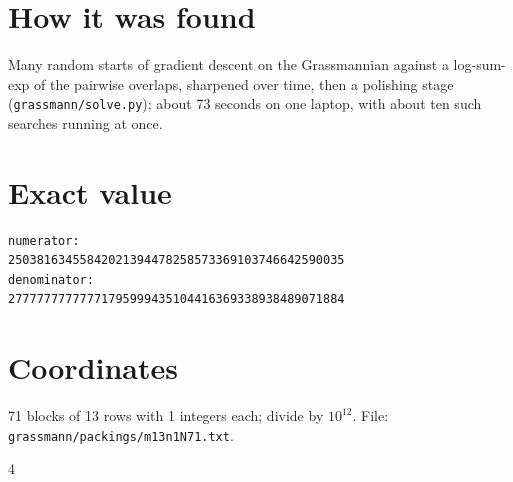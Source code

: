 \documentclass[11pt,a4paper]{article}
\begin{document}
\section{How it was found}
Many random starts of gradient descent on the Grassmannian against a log-sum-exp of the pairwise overlaps, sharpened over time, then a polishing stage (\texttt{grassmann/solve.py}); about 73 seconds on one laptop, with about ten such searches running at once.


\appendix
\section{Exact value}
{\small
\begin{verbatim}
numerator:
25038163455842021394478258573369103746642590035
denominator:
27777777777771795999435104416369338938489071884
\end{verbatim}}

\section{Coordinates}
71 blocks of 13 rows with 1 integers each; divide by $10^{12}$. File: \texttt{grassmann/packings/m13n1N71.txt}.
{\tiny
\begin{multicols}{4}
\end{multicols}}
\end{document}
